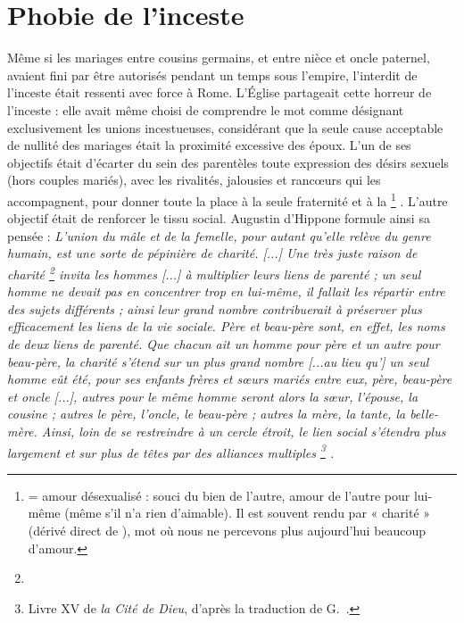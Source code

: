 \section{Phobie de l'inceste}

 Même si les mariages entre cousins germains, et entre nièce et oncle paternel, avaient fini par être autorisés pendant un temps sous l'empire, l'interdit de l'inceste était ressenti avec force à Rome. L'Église partageait cette horreur de l'inceste : elle avait même choisi de comprendre le mot  comme désignant exclusivement les unions incestueuses, considérant que la seule cause acceptable de nullité des mariages était la proximité excessive des époux. L'un de ses objectifs était d'écarter du sein des parentèles toute expression des désirs sexuels (hors couples mariés), avec les rivalités, jalousies et rancœurs qui les accompagnent, pour donner toute la place à la seule fraternité et à la %
\footnote{ = amour désexualisé : souci du bien de l'autre, amour de l'autre pour lui-même (même s'il n'a rien d'aimable). Il est souvent rendu par « charité » (dérivé direct de ), mot où nous ne percevons plus aujourd'hui beaucoup d'amour.}%
. L'autre objectif était de renforcer le tissu social. Augustin d'Hippone formule ainsi sa pensée : \emph{L'union du mâle et de la femelle, pour autant qu'elle relève du genre humain, est une sorte de pépinière de charité. \emph{[...]} Une très juste raison de charité%
\footnote{}
invita les hommes \emph{[...]} à multiplier leurs liens de parenté ; un seul homme ne devait pas en concentrer trop en lui-même, il fallait les répartir entre des sujets différents ; ainsi leur grand nombre contribuerait à préserver plus efficacement les liens de la vie sociale. Père et beau-père sont, en effet, les noms de deux liens de parenté. Que chacun ait un homme pour père et un autre pour beau-père, la charité s'étend sur un plus grand nombre \emph{[...au lieu qu']} un seul homme eût été, pour ses enfants frères et sœurs mariés entre eux, père, beau-père et oncle \emph{[...]}, autres pour le même homme seront alors la sœur, l'épouse, la cousine ; autres le père, l'oncle, le beau-père ; autres la mère, la tante, la belle-mère. Ainsi, loin de se restreindre à un cercle étroit, le lien social s'étendra plus largement et sur plus de têtes par des alliances multiples%
\footnote{Livre XV de \emph{la Cité de Dieu}, d'après la traduction de G.~.}%
.}

